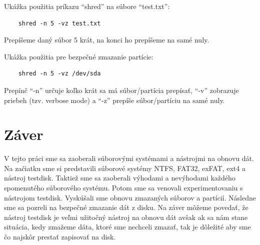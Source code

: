 \documentclass[12pt,oneside,slovak,a4paper]{article}
\begin{document}
Ukážka použitia príkazu ``shred'' na súbore ``test.txt'':
\begin{verbatim}
	shred -n 5 -vz test.txt
\end{verbatim}
Prepíšeme daný súbor 5 krát, na konci ho prepíšeme na samé nuly.

Ukážka použitia pre bezpečné zmazanie partície:
\begin{verbatim}
	shred -n 5 -vz /dev/sda
\end{verbatim}

Prepínč ``-n'' určuje koľko krát sa má súbor/partícia prepísať, ``-v'' zobrazuje priebeh (tzv. verbose mode) a ``-z'' prepíše súbor/partíciu na samé nuly.

\section{Záver}
V tejto práci sme sa zaoberali súborovými systémami a nástrojmi na obnovu dát. Na začiatku sme si predstavili súborové systémy NTFS, FAT32, exFAT, ext4 a nástroj testdisk. Taktiež sme sa zaoberali výhodami a nevýhodami každého spomenutého súborového systému. Potom sme sa venovali experimentovaniu s nástrojom testdisk. Vyskúšali sme obnovu zmazaných súborov a partícií. Následne sme sa pozreli na bezpečné zmazanie dát z disku. Na záver môžeme povedať, že nástroj testdisk je veľmi užitočný nástroj na obnovu dát avšak ak sa nám stane situácia, kedy zmažeme dáta, ktoré sme nechceli zmazať, tak je dôležité aby sme čo najskôr prestať zapisovať na disk.

\pagebreak


\end{document}
